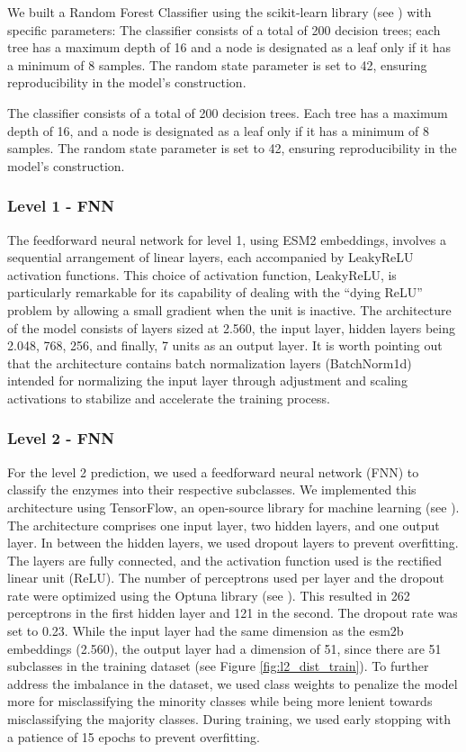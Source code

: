 \documentclass{bioinfo}
\begin{document}
\begin{methods}
We built a Random Forest Classifier using the scikit-learn library (see \cite{scikit-learn}) with specific parameters: 
The classifier consists of a total of 200 decision trees; each tree has a
maximum depth of 16 and a node is designated as a leaf only if it has a
minimum of 8 samples. The random state parameter is set to 42, ensuring
reproducibility in the model's construction.

The classifier consists of a total of 200 decision trees.
Each tree has a maximum depth of 16, and a node is designated as a leaf only if it has a minimum of 8 samples.
The random state parameter is set to 42, ensuring reproducibility in the model's construction.

\subsubsection{Level 1 - FNN}
The feedforward neural network for level 1, using ESM2 embeddings, involves a sequential arrangement of linear layers, each accompanied by LeakyReLU activation functions.
This choice of activation function, LeakyReLU, is particularly remarkable for its capability of dealing with the ``dying ReLU'' problem by 
allowing a small gradient when the unit is inactive. 
The architecture of the model consists of layers sized at 2.560, the input layer, hidden layers being 2.048,
768, 256, and finally, 7 units as an output layer.
It is worth pointing out that the architecture contains batch normalization layers (BatchNorm1d) intended for 
normalizing the input layer through adjustment and scaling activations to stabilize and accelerate the training process.

\subsubsection{Level 2 - FNN}
For the level 2 prediction, we used a feedforward neural network (FNN) to classify the enzymes into their respective subclasses.
We implemented this architecture using TensorFlow, an open-source library for machine learning (see \cite{tensorflow2015-whitepaper}).
The architecture comprises one input layer, two hidden layers, and one output layer.
In between the hidden layers, we used dropout layers to prevent overfitting.
The layers are fully connected, and the activation function used is the rectified linear unit (ReLU).
The number of perceptrons used per layer and the dropout rate were optimized using the Optuna library (see \cite{optuna_2019}).
This resulted in 262 perceptrons in the first hidden layer and 121 in the second.
The dropout rate was set to 0.23.
While the input layer had the same dimension as the esm2b embeddings (2.560), the output layer had a dimension of 51,
since there are 51 subclasses in the training dataset (see Figure \ref{fig:l2_dist_train}).
To further address the imbalance in the dataset, we used class weights to penalize the model more for misclassifying the minority classes
while being more lenient towards misclassifying the majority classes.
During training, we used early stopping with a patience of 15 epochs to prevent overfitting.



\end{methods}
\end{document}
